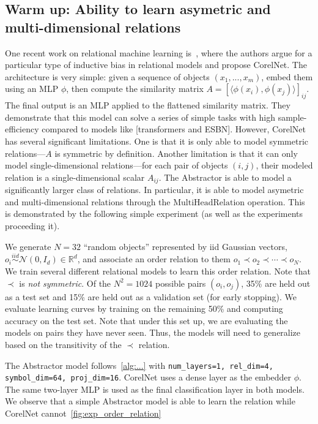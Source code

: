 \subsection{Warm up: Ability to learn asymetric and multi-dimensional relations}
One recent work on relational machine learning is~\cite{corelnet}, where the authors argue for a particular type of inductive bias in relational models and propose CorelNet. The architecture is very simple: given a sequence of objects $(x_1, ..., x_m)$, embed them using an MLP $\phi$, then compute the similarity matrix $A = \left[\langle\phi(x_i), \phi(x_j)\rangle\right]_{ij}$. The final output is an MLP applied to the flattened similarity matrix. They demonstrate that this model can solve a series of simple tasks with high sample-efficiency compared to models like [transformers and ESBN]. However, CorelNet has several significant limitations. One is that it is only able to model symmetric relations---$A$ is symmetric by definition. Another limitation is that it can only model single-dimensional relations---for each pair of objects $(i,j)$, their modeled relation is a single-dimensional scalar $A_{ij}$. The Abstractor is able to model a significantly larger class of relations. In particular, it is able to model asymetric and multi-dimensional relations through the $\text{MultiHeadRelation}$ operation. This is demonstrated by the following simple experiment (as well as the experiments proceeding it).

We generate $N = 32$ ``random objects'' represented by iid Gaussian vectors, $o_i \overset{iid}{\sim} \mathcal{N}(0, I_d) \in \mathbb{R}^d$, and associate an order relation to them $o_1 \prec o_2 \prec \cdots \prec o_N$. We train several different relational models to learn this order relation. Note that $\prec$ is \textit{not symmetric}. Of the $N^2 = 1024$ possible pairs $(o_i, o_j)$, 35\% are held out as a test set and 15\% are held out as a validation set (for early stopping). We evaluate learning curves by training on the remaining 50\% and computing accuracy on the test set. Note that under this set up, we are evaluating the models on pairs they have never seen. Thus, the models will need to generalize based on the transitivity of the $\prec$ relation.

The Abstractor model follows~\cref{alg:...} with \texttt{num\_layers=1, rel\_dim=4, symbol\_dim=64, proj\_dim=16}. CorelNet uses a dense layer as the embedder $\phi$. The same two-layer MLP is used as the final classification layer in both models. We observe that a simple Abstractor model is able to learn the relation while CorelNet cannot~\cref{fig:exp_order_relation}

